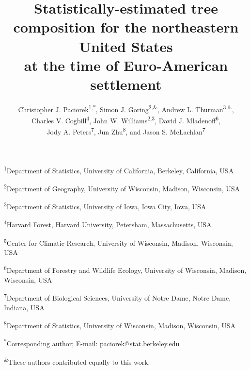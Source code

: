\documentclass[12pt]{article}
\newcommand{\lyxaddress}[1]{
\par {\raggedright #1
\vspace{1.4em}
\noindent\par}
}
\begin{document}
\title{Statistically-estimated tree composition for the northeastern United
States \\
at the time of Euro-American settlement}


\author{Christopher J. Paciorek\textsuperscript{1,{*}}, Simon J. Goring\textsuperscript{2,\&},
Andrew L. Thurman\textsuperscript{3,\&}, \\
Charles V. Cogbill\textsuperscript{4}, John W. Williams\textsuperscript{2,3},
David J. Mladenoff\textsuperscript{6}, \\
Jody A. Peters\textsuperscript{7}, Jun Zhu\textsuperscript{8}, and
Jason S. McLachlan\textsuperscript{7}}

\maketitle

\lyxaddress{\textsuperscript{1}Department of Statistics, University of California, Berkeley, California, USA}


\lyxaddress{\textsuperscript{2}Department of Geography, University of Wisconsin, Madison, Wisconsin, USA}


\lyxaddress{\textsuperscript{3}Department of Statistics, University of Iowa, Iowa City, Iowa, USA}


\lyxaddress{\textsuperscript{4}Harvard Forest, Harvard University, Petersham, Massachusetts, USA}


\lyxaddress{\textsuperscript{5}Center for Climatic Research, University of Wisconsin,
Madison, Wisconsin, USA}


\lyxaddress{\textsuperscript{6}Department of Forestry and Wildlife Ecology,
University of Wisconsin, Madison, Wisconsin, USA}


\lyxaddress{\textsuperscript{7}Department of Biological Sciences, University
of Notre Dame, Notre Dame, Indiana, USA}


\lyxaddress{\textsuperscript{8}Department of Statistics, University of Wisconsin,
Madison, Wisconsin, USA}


\lyxaddress{\textsuperscript{{*}}Corresponding author; E-mail: paciorek@stat.berkeley.edu}


\lyxaddress{\textsuperscript{\&}These authors contributed equally to this work.
\newpage}
\end{document}
